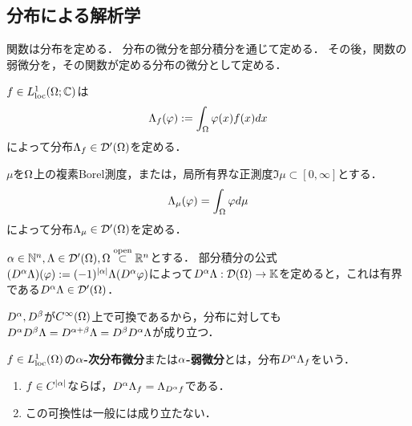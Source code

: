 \documentclass[uplatex,dvipdfmx]{jsreport}
\begin{document}
\subsection{分布による解析学}

\begin{tcolorbox}[colframe=ForestGreen, colback=ForestGreen!10!white,breakable,colbacktitle=ForestGreen!40!white,coltitle=black,fonttitle=\bfseries\sffamily,
title=]
    関数は分布を定める．
    分布の微分を部分積分を通じて定める．
    その後，関数の弱微分を，その関数が定める分布の微分として定める．
\end{tcolorbox}

\begin{example}[関数は分布]
    $f\in L^1_{\mathrm{loc}}(\Omega;\mathbb{C})$は
    \[\Lambda_f(\varphi):=\int_\Omega\varphi(x)f(x)dx\]
    によって分布$\Lambda_f\in\mathcal{D}'(\Omega)$を定める．
\end{example}

\begin{example}[測度は分布]
    $\mu$を$\Omega$上の複素Borel測度，または，局所有界な正測度$\Im\mu\subset[0,\infty]$とする．
    \[\Lambda_\mu(\varphi)=\int_\Omega\varphi d\mu\]
    によって分布$\Lambda_\mu\in\mathcal{D}'(\Omega)$を定める．
\end{example}

\begin{definition}
    $\alpha\in\mathbb{N}^n,\Lambda\in\mathcal{D}'(\Omega),\Omega\overset{\mathrm{open}}{\subset}\mathbb{R}^n$とする．
    部分積分の公式$(D^\alpha\Lambda)(\varphi):=(-1)^{\lvert\alpha\rvert}\Lambda(D^\alpha\varphi)$によって$D^\alpha\Lambda:\mathcal{D}(\Omega)\to\mathbb{K}$を定めると，これは有界である$D^\alpha\Lambda\in\mathcal{D}'(\Omega)$．
\end{definition}
\begin{remark}
    $D^\alpha,D^\beta$が$C^\infty(\Omega)$上で可換であるから，分布に対しても$D^\alpha D^\beta\Lambda=D^{\alpha+\beta}\Lambda=D^\beta D^\alpha\Lambda$が成り立つ．
\end{remark}

\begin{definition}
    $f\in L^1_{\mathrm{loc}}(\Omega)$の\textbf{$\alpha$-次分布微分}または\textbf{$\alpha$-弱微分}とは，分布$D^\alpha\Lambda_f$をいう．
\end{definition}

\begin{lemma}\mbox{}
    \begin{enumerate}
        \item $f\in C^{\lvert\alpha\rvert}$ならば，$D^\alpha\Lambda_f=\Lambda_{D^\alpha f}$である．
        \item この可換性は一般には成り立たない．
    \end{enumerate}
\end{lemma}
\end{document}
